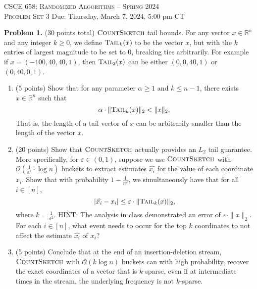 \documentclass[11pt]{article}
\newcommand{\eps}{\varepsilon}
\newcommand{\tail}{\textsc{Tail}}
\newcommand{\CountSketch}{\textsc{CountSketch}}
\begin{document}
\begin{center}
{\Large\textsc{CSCE 658: Randomized Algorithms -- Spring 2024 \\ 
Problem Set 3}}
\vskip 0.1in
Due: Thursday, March 7, 2024, 5:00 pm CT
\end{center}

\noindent
\textbf{Problem 1.} (30 points total)
$\CountSketch$ tail bounds. 
\vskip 0.1in\noindent
For any vector $x\in\mathbb{R}^n$ and any integer $k\ge 0$, we define $\tail_k(x)$ to be the vector $x$, but with the $k$ entries of largest magnitude to be set to $0$, breaking ties arbitrarily. 
For example if $x=(-100, 40, 40, 1)$, then $\tail_2(x)$ can be either $(0, 0, 40, 1)$ or $(0, 40, 0, 1)$.
\begin{enumerate}
\item (5 points)
Show that for any parameter $\alpha\ge 1$ and $k\le n-1$, there exists $x\in\mathbb{R}^n$ such that
\[\alpha\cdot\|\tail_k(x)\|_2<\|x\|_2.\]
That is, the length of a tail vector of $x$ can be arbitrarily smaller than the length of the vector $x$. 
\item (20 points)
Show that $\CountSketch$ actually provides an $L_2$ tail guarantee. 
More specifically, for $\eps\in(0,1)$, suppose we use $\CountSketch$ with $\mathcal{O}\left(\frac{1}{\eps^2}\cdot\log n\right)$ buckets to extract estimates $\widehat{x_i}$ for the value of each coordinate $x_i$. 
Show that with probability $1-\frac{1}{n^2}$, we simultaneously have that for all $i\in[n]$,
\[|\widehat{x_i}-x_i|\le\eps\cdot\|\tail_k(x)\|_2,\]
where $k=\frac{1}{\eps^2}$. 
\vskip 0.1in\noindent
HINT: The analysis in class demonstrated an error of $\eps\cdot\|x\|_2$. For each $i\in[n]$, what event needs to occur for the top $k$ coordinates to not affect the estimate $\widehat{x_i}$ of $x_i$?
\item (5 points)
Conclude that at the end of an insertion-deletion stream, $\CountSketch$ with $\mathcal{O}(k\log n)$ buckets can with high probability, recover the exact coordinates of a vector that is $k$-sparse, even if at intermediate times in the stream, the underlying frequency is not $k$-sparse.
\end{enumerate}
\end{document}
